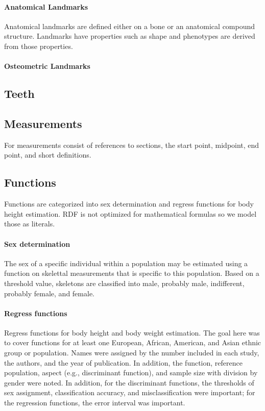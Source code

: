 \documentclass[sw]{iosart2x}
\begin{document}
\paragraph{Anatomical Landmarks}
Anatomical landmarks are defined either on a bone or an anatomical compound structure.
Landmarks have properties such as shape and phenotypes are derived from those properties.

\paragraph{Osteometric Landmarks}

\subsection{Teeth}
\subsection{Measurements}
For measurements consist of references to sections, the start point, midpoint, end point, and short definitions.

\subsection{Functions}
Functions are categorized into sex determination and regress functions for body height estimation.
RDF is not optimized for mathematical formulas so we model those as literals.

\paragraph{Sex determination}
The sex of a specific individual within a population may be estimated using a function on skelettal measurements that is specific to this population.
Based on a threshold value, skeletons are classified into male, probably male, indifferent, probably female, and female.

\paragraph{Regress functions}
Regress functions for body height and body weight estimation.
The goal here was to cover functions for at least one European, African, American, and Asian ethnic group or population.
Names were assigned by the number included in each study, the authors, and the year of publication.
In addition, the function, reference population, aspect (e.g., discriminant function), and sample size with division by gender were noted.
In addition, for the discriminant functions, the thresholds of sex assignment, classification accuracy, and misclassification were important; for the regression functions, the error interval was important.
\end{document}
